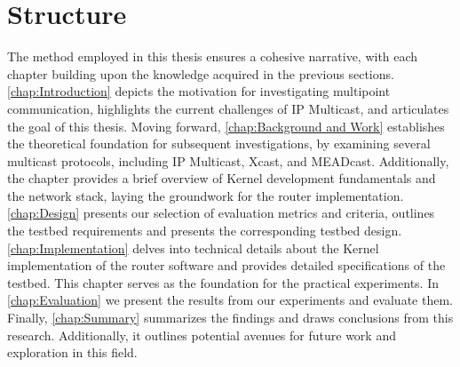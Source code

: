 \section{Structure} %
\label{sec:Structure}
The method employed in this thesis ensures a cohesive narrative, with each
    chapter building upon the knowledge acquired in the previous sections.
\autoref{chap:Introduction} depicts the motivation for investigating multipoint
    communication, highlights the current challenges of IP Multicast, and
    articulates the goal of this thesis.
Moving forward, \autoref{chap:Background and Work} establishes the theoretical
    foundation for subsequent investigations, by examining several multicast
    protocols, including IP Multicast, Xcast, and MEADcast.
Additionally, the chapter provides a brief overview of Kernel development
    fundamentals and the network stack, laying the groundwork for the router
    implementation.
\autoref{chap:Design} presents our selection of evaluation metrics and
    criteria, outlines the testbed requirements and presents the corresponding
    testbed design.
\autoref{chap:Implementation} delves into technical details about the Kernel
    implementation of the router software and provides detailed specifications
    of the testbed.
This chapter serves as the foundation for the practical experiments.
In \autoref{chap:Evaluation} we present the results from our experiments and
    evaluate them.
Finally, \autoref{chap:Summary} summarizes the findings and draws conclusions
    from this research.
Additionally, it outlines potential avenues for future work and exploration in
    this field.

